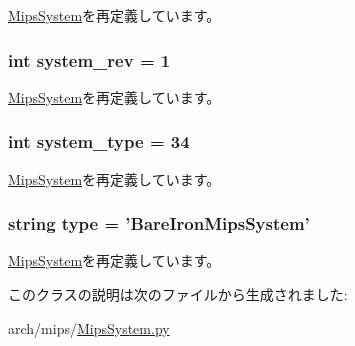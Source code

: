 \hyperlink{classMipsSystem_1_1MipsSystem_a646616e47eba70e20cb5c35443d7bf4a}{MipsSystem}を再定義しています。\hypertarget{classMipsSystem_1_1BareIronMipsSystem_a261e4081ddd1f0823eccc0f042086c27}{
\subsubsection[{system\_\-rev}]{\setlength{\rightskip}{0pt plus 5cm}int system\_\-rev = 1}}
\label{classMipsSystem_1_1BareIronMipsSystem_a261e4081ddd1f0823eccc0f042086c27}


\hyperlink{classMipsSystem_1_1MipsSystem_a0f86e3835b8bf2135faf7b1bab968494}{MipsSystem}を再定義しています。\hypertarget{classMipsSystem_1_1BareIronMipsSystem_acfe3506cfe10e05a2cb2c2973dc5dad2}{
\subsubsection[{system\_\-type}]{\setlength{\rightskip}{0pt plus 5cm}int system\_\-type = 34}}
\label{classMipsSystem_1_1BareIronMipsSystem_acfe3506cfe10e05a2cb2c2973dc5dad2}


\hyperlink{classMipsSystem_1_1MipsSystem_af401252d15d9cecde29d1fdcbaba250d}{MipsSystem}を再定義しています。\hypertarget{classMipsSystem_1_1BareIronMipsSystem_acce15679d830831b0bbe8ebc2a60b2ca}{
\subsubsection[{type}]{\setlength{\rightskip}{0pt plus 5cm}string type = '{\bf BareIronMipsSystem}'}}
\label{classMipsSystem_1_1BareIronMipsSystem_acce15679d830831b0bbe8ebc2a60b2ca}


\hyperlink{classMipsSystem_1_1MipsSystem_acce15679d830831b0bbe8ebc2a60b2ca}{MipsSystem}を再定義しています。

このクラスの説明は次のファイルから生成されました:\begin{DoxyCompactItemize}
\item 
arch/mips/\hyperlink{MipsSystem_8py}{MipsSystem.py}\end{DoxyCompactItemize}
